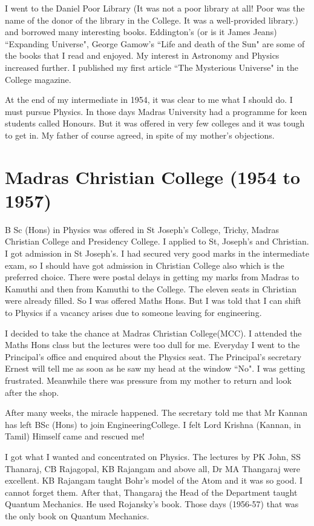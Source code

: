 I went to the Daniel Poor Library (It was not a poor library at all! 
Poor was the name of the donor of the library in the College. It was a 
well-provided library.) and borrowed many interesting books. Eddington's 
(or is it James Jeans) ``Expanding Universe", George Gamow's ``Life and 
death of the Sun" are some of the books that I read and enjoyed. My 
interest in Astronomy and Physics increased further. I published my 
first article ``The Mysterious Universe" in the College magazine.

At the end of my intermediate in 1954, it was clear to me what I should 
do. I must pursue Physics. In those days Madras University had a 
programme for keen students called Honours. But it was offered in very 
few colleges and it was tough to get in. My father of course agreed, 
in spite of my mother's objections.

\section*{Madras Christian College (1954 to 1957)}

B Sc (Hons) in Physics was offered in St Joseph's College, Trichy, 
Madras Christian College and Presidency College. I applied to St, 
Joseph's and Christian. I got admission in St Joseph's. I had secured 
very good marks in the intermediate exam, so I should have got admission 
in Christian College also which is the preferred choice.  There were 
postal delays in getting my marks from Madras to Kamuthi and then from 
Kamuthi to the College. The eleven seats in Christian were already 
filled. So I was offered Maths Hons. But I was told that I can shift to 
Physics if a vacancy arises due to someone leaving for engineering.

I decided to take the chance at Madras Christian College\break  (MCC). I 
attended the Maths Hons class but the lectures were too dull for me. 
Everyday I went to the Principal's office and enquired about the Physics 
seat. The Principal's secretary Ernest will tell me as soon as he saw my 
head at the window ``No". I was getting frustrated. Meanwhile there was 
pressure from my mother to return and look after the shop.

After many weeks, the miracle happened. The secretary told me that Mr 
Kannan has left BSc (Hons) to join Engineering\break College. I felt Lord 
Krishna (Kannan, in Tamil) Himself came and rescued me!

I got what I wanted and concentrated on Physics. The lectu\-res by PK 
John, SS Thanaraj, CB Rajagopal, KB Rajangam and above all, Dr MA 
Thangaraj were excellent. KB Rajangam taught Bohr's model of the Atom 
and it was so good. I cannot forget them. After that, Thangaraj the Head 
of the Department taught Quantum Mechanics. He used Rojansky's book. 
Those days (1956-57) that was the only book on Quantum Mechanics.


